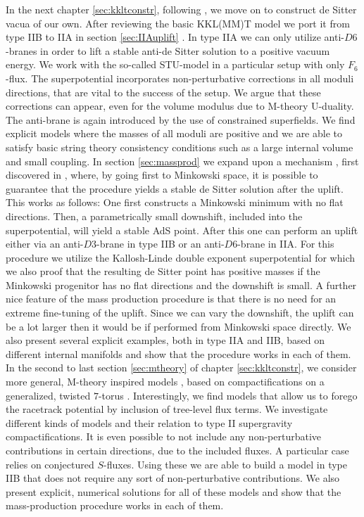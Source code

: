 \documentclass[a4paper,12pt,twoside,openright]{report}
\begin{document}
In the next chapter \ref{sec:kkltconstr}, following \cite{Cribiori:2019bfx,Cribiori:2019drf,Cribiori:2019hrb}, we move on to construct de Sitter vacua of our own. After reviewing the basic KKL(MM)T model \cite{Kachru:2003aw,Kachru:2003sx} we  port it from type IIB to IIA in section \ref{sec:IIAuplift} \cite{Cribiori:2019bfx}. In type IIA we can only utilize anti-$D6$-branes in order to lift a stable anti-de Sitter solution to a positive vacuum energy. We work with the so-called STU-model in a particular setup with only $F_6$-flux. The superpotential incorporates non-perturbative corrections in all moduli directions, that are vital to the success of the setup. We argue that these corrections can appear, even for the volume modulus due to M-theory U-duality. The anti-brane is again introduced by the use of constrained superfields. We find explicit models where the masses of all moduli are positive and we are able to satisfy basic string theory consistency conditions such as a large internal volume and small coupling. In section \ref{sec:massprod} we expand upon a mechanism \cite{Cribiori:2019drf}, first discovered in \cite{Kallosh:2019zgd}, where, by going first to Minkowski space, it is possible to guarantee that the procedure yields a stable de Sitter solution after the uplift. This works as follows: One first constructs a Minkowski minimum with no flat directions. Then, a parametrically small downshift, included into the superpotential, will yield a stable AdS point. After this one can perform an uplift either via an anti-$D3$-brane in type IIB or an anti-$D6$-brane in IIA. For this procedure we utilize the Kallosh-Linde double exponent superpotential \cite{Kallosh:2004yh} for which we also proof that the resulting de Sitter point has positive masses if the Minkowski progenitor has no flat directions and the downshift is small. A further nice feature of the mass production procedure is that there is no need for an extreme fine-tuning of the uplift. Since we can vary the downshift, the uplift can be a lot larger then it would be if performed from Minkowski space directly. We also present several explicit examples, both in type IIA and IIB, based on different internal manifolds and show that the procedure works in each of them. In the second to last section \ref{sec:mtheory} of chapter \ref{sec:kkltconstr}, we consider more general, M-theory inspired models \cite{Cribiori:2019hrb}, based on compactifications on a generalized, twisted $7$-torus \cite{DallAgata:2005zlf,Duff:2010vy,Derendinger:2014wwa,Ferrara:2016fwe}. Interestingly, we find models that allow us to forego the racetrack potential by inclusion of tree-level flux terms. We investigate different kinds of models and their relation to type II supergravity compactifications. It is even possible to not include any non-perturbative contributions in certain directions, due to the included fluxes. A particular case relies on conjectured $S$-fluxes. Using these we are able to build a model in type IIB that does not require any sort of non-perturbative contributions. We also present explicit, numerical solutions for all of these models and show that the mass-production procedure works in each of them.\\
\end{document}
